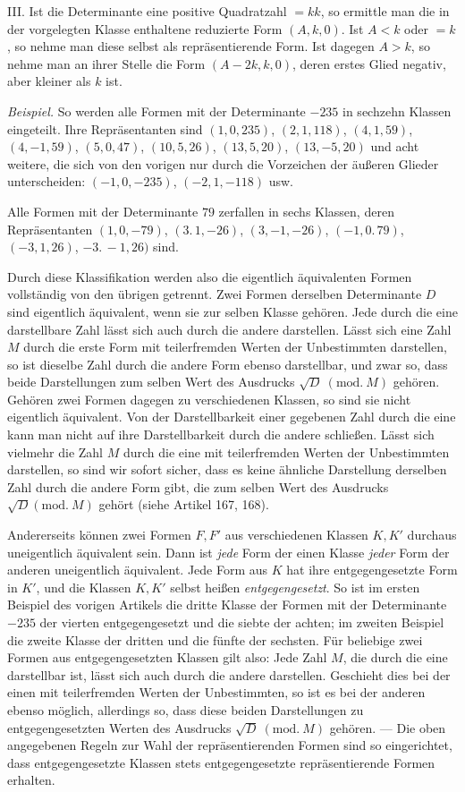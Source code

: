 III. Ist die Determinante eine positive Quadratzahl $=kk$, so ermittle man die in der vorgelegten Klasse enthaltene reduzierte Form $(A,k,0)$. Ist $A<k$ oder $=k$, so nehme man diese selbst als repräsentierende Form. Ist dagegen $A>k$, so nehme man an ihrer Stelle die Form $(A-2k,k,0)$, deren erstes Glied negativ, aber kleiner als $k$ ist.

\textit{Beispiel.} So werden alle Formen mit der Determinante $-235$ in sechzehn Klassen eingeteilt. Ihre Repräsentanten sind $(1,0,235)$, $(2,1,118)$, $(4,1,59)$, $(4,-1,59)$, $(5,0,47)$, $(10,5,26)$, $(13,5,20)$, $(13,-5,20)$ und acht weitere, die sich von den vorigen nur durch die Vorzeichen der äußeren Glieder unterscheiden: $(-1,0,-235)$, $(-2,1,-118)$ usw.

Alle Formen mit der Determinante $79$ zerfallen in sechs Klassen, deren Repräsentanten $(1,0,-79)$, $(3.\,1,-26)$, $(3,-1,-26)$, $(-1,0.\,79)$, $(-3,1,26)$, $-3.\,-1,26)$ sind.

Durch diese Klassifikation werden also die eigentlich äquivalenten Formen vollständig von den übrigen getrennt. Zwei Formen derselben Determinante $D$ sind eigentlich äquivalent, wenn sie zur selben Klasse gehören. Jede durch die eine darstellbare Zahl lässt sich auch durch die andere darstellen. Lässt sich eine Zahl $M$ durch die erste Form mit teilerfremden Werten der Unbestimmten darstellen, so ist dieselbe Zahl durch die andere Form ebenso darstellbar, und zwar so, dass beide Darstellungen zum selben Wert des Ausdrucks $\sqrt{D}\ (\mathrm{mod.}\ M)$ gehören. Gehören zwei Formen dagegen zu verschiedenen Klassen, so sind sie nicht eigentlich äquivalent. Von der Darstellbarkeit einer gegebenen Zahl durch die eine kann man nicht auf ihre Darstellbarkeit durch die andere schließen. Lässt sich vielmehr die Zahl $M$ durch die eine mit teilerfremden Werten der Unbestimmten darstellen, so sind wir sofort sicher, dass es keine ähnliche Darstellung derselben Zahl durch die andere Form gibt, die zum selben Wert des Ausdrucks $\sqrt{D}(\mathrm{mod.}\ M)$ gehört (siehe Artikel 167, 168).

Andererseits können zwei Formen $F,F'$ aus verschiedenen Klassen $K,K'$ durchaus uneigentlich äquivalent sein. Dann ist \textit{jede} Form der einen Klasse \textit{jeder} Form der anderen uneigentlich äquivalent. Jede Form aus $K$ hat ihre entgegengesetzte Form in $K'$, und die Klassen $K,K'$ selbst heißen \textit{entgegengesetzt}. So ist im ersten Beispiel des vorigen Artikels die dritte Klasse der Formen mit der Determinante $-235$ der vierten entgegengesetzt und die siebte der achten; im zweiten Beispiel die zweite Klasse der dritten und die fünfte der sechsten. Für beliebige zwei Formen aus entgegengesetzten Klassen gilt also: Jede Zahl $M$, die durch die eine darstellbar ist, lässt sich auch durch die andere darstellen. Geschieht dies bei der einen mit teilerfremden Werten der Unbestimmten, so ist es bei der anderen ebenso möglich, allerdings so, dass diese beiden Darstellungen zu entgegengesetzten Werten des Ausdrucks $\sqrt{D}\ (\mathrm{mod.}\ M)$ gehören. --- Die oben angegebenen Regeln zur Wahl der repräsentierenden Formen sind so eingerichtet, dass entgegengesetzte Klassen stets entgegengesetzte repräsentierende Formen erhalten.

